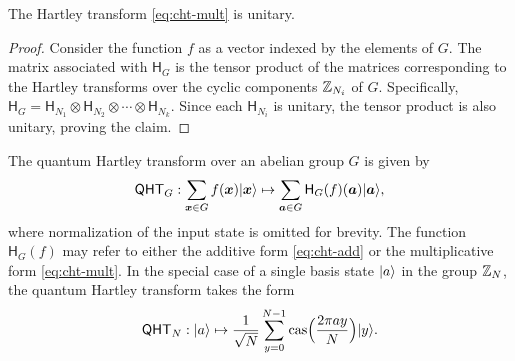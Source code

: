 \documentclass[12pt]{report}
\newcommand{\cas}{\mathrm{cas}}
\newcommand{\cht}{\mathsf{H}}
\newcommand{\qht}{\mathsf{QHT}}
\begin{document}
\begin{lemma}
    The Hartley transform \eqref{eq:cht-mult} is unitary.
\end{lemma}

\begin{proof}
    Consider the function $f$ as a vector indexed by the elements of $G$. The matrix associated with $\cht_G$ is the tensor product of the matrices corresponding to the Hartley transforms over the cyclic components $\mathbb{Z}_{N_i}$ of $G$. Specifically, $\cht_G = \cht_{N_1} \otimes \cht_{N_2} \otimes \cdots \otimes \cht_{N_k}$. Since each $\cht_{N_i}$ is unitary, the tensor product is also unitary, proving the claim.
\end{proof}

The quantum Hartley transform over an abelian group $G$ is given by
\begin{equation}
    \label{eq:qht}
    \qht_G: \sum_{\bm{x} \in G} f(\bm{x}) \ket{\bm{x}} \mapsto \sum_{\bm{a} \in G} \cht_G(f)(\bm{a}) \ket{\bm{a}},
\end{equation}
where normalization of the input state is omitted for brevity. The function $\cht_G(f)$ may refer to either the additive form \eqref{eq:cht-add} or the multiplicative form \eqref{eq:cht-mult}. In the special case of a single basis state $\lvert a\rangle$ in the group $\mathbb{Z}_N$, the quantum Hartley transform takes the form
\begin{equation}
	\label{eq:qht-N}
	\qht_N: \ket{a} \mapsto \frac{1}{\sqrt{N}} \sum_{y = 0}^{N - 1} \cas\Big(\frac{2\pi a y}{N}\Big) \ket{y}.
\end{equation}




\end{document}
